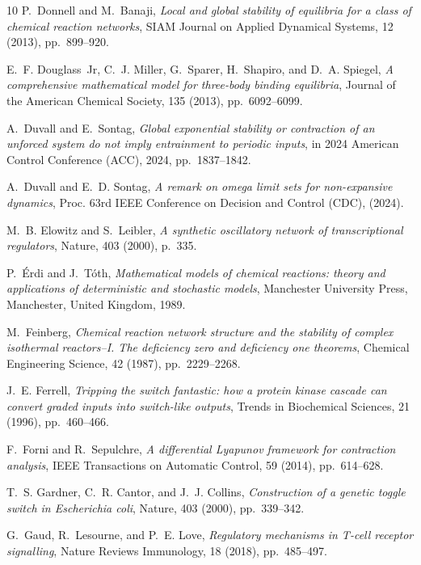 \documentclass[onefignum,onetabnum]{siamonline220329}
\begin{document}
{\begin{thebibliography}{10}
	{\sc P.~Donnell and M.~Banaji}, {\em Local and global stability of equilibria
		for a class of chemical reaction networks}, SIAM Journal on Applied Dynamical
	Systems, 12 (2013), pp.~899--920.
	
	{\sc E.~F. Douglass~Jr, C.~J. Miller, G.~Sparer, H.~Shapiro, and D.~A.
		Spiegel}, {\em A comprehensive mathematical model for three-body binding
		equilibria}, Journal of the American Chemical Society, 135 (2013),
	pp.~6092--6099.
	
	{\sc A.~Duvall and E.~Sontag}, {\em Global exponential stability or contraction
		of an unforced system do not imply entrainment to periodic inputs}, in 2024
	American Control Conference (ACC), 2024, pp.~1837--1842.
	
	{\sc A.~Duvall and E.~D. Sontag}, {\em A remark on omega limit sets for
		non-expansive dynamics}, Proc. 63rd IEEE Conference on Decision and Control
	(CDC),  (2024).
	
	{\sc M.~B. Elowitz and S.~Leibler}, {\em A synthetic oscillatory network of
		transcriptional regulators}, Nature, 403 (2000), p.~335.
	
	{\sc P.~{\'E}rdi and J.~T{\'o}th}, {\em Mathematical models of chemical
		reactions: theory and applications of deterministic and stochastic models},
	Manchester University Press, Manchester, United Kingdom, 1989.
	
	{\sc M.~Feinberg}, {\em Chemical reaction network structure and the stability
		of complex isothermal reactors--{I}. {T}he deficiency zero and deficiency one
		theorems}, Chemical Engineering Science, 42 (1987), pp.~2229--2268.
	
	{\sc J.~E. Ferrell}, {\em Tripping the switch fantastic: how a protein kinase
		cascade can convert graded inputs into switch-like outputs}, Trends in
	Biochemical Sciences, 21 (1996), pp.~460--466.
	
	{\sc F.~Forni and R.~Sepulchre}, {\em A differential {L}yapunov framework for
		contraction analysis}, IEEE Transactions on Automatic Control, 59 (2014),
	pp.~614--628.
	
	{\sc T.~S. Gardner, C.~R. Cantor, and J.~J. Collins}, {\em Construction of a
		genetic toggle switch in {E}scherichia coli}, Nature, 403 (2000),
	pp.~339--342.
	
	{\sc G.~Gaud, R.~Lesourne, and P.~E. Love}, {\em Regulatory mechanisms in
		{T}-cell receptor signalling}, Nature Reviews Immunology, 18 (2018),
	pp.~485--497.
	

\end{thebibliography}}
\end{document}
